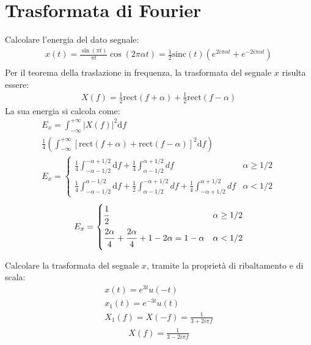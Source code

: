 \documentclass{article}
\newcommand{\rect}{\mbox{rect}}
\newcommand{\sinc}{\mbox{sinc}}
\newcommand{\df}{\mathrm{d}}
\begin{document}
\clearpage

\section{Trasformata di Fourier}
Calcolare l'energia del dato segnale:
\begin{gather*}
    x(t)=\displaystyle\frac{\sin(\pi t)}{\pi t}\cos(2\pi \alpha t)=\frac{1}{2}\sinc(t)(e^{2i\pi\alpha t}+e^{-2i\pi\alpha t})\\
\end{gather*}
Per il teorema della traslazione in frequenza, la trasformata del segnale $x$ risulta essere:
\begin{gather*}
    X(f)=\displaystyle\frac{1}{2}\rect(f+\alpha)+\frac{1}{2}\rect(f-\alpha)
\end{gather*}
La sua energia si calcola come:
\begin{gather*}
    E_x=\displaystyle\int_{-\infty}^{+\infty}|X(f)|^2\df f\\
    \displaystyle\frac{1}{4}\left(\int_{-\infty}^{+\infty}\left[\rect(f+\alpha)+\rect(f-\alpha)\right]^2\df f\right)\\
    E_x=\begin{cases}
        \displaystyle\frac{1}{4}\int_{-\alpha-1/2}^{-\alpha+1/2}\df f+\frac{1}{4}\int_{\alpha-1/2}^{\alpha+1/2}df& \alpha\geq1/2\\
        \displaystyle\frac{1}{4}\int_{-\alpha-1/2}^{\alpha-1/2}\df f+\frac{1}{2}\int_{\alpha-1/2}^{-\alpha+1/2}df+\frac{1}{4}\int_{-\alpha+1/2}^{\alpha+1/2}df&\alpha<1/2
    \end{cases}
\end{gather*}
\begin{gather}
    E_x=\begin{cases}
        \displaystyle\frac{\strut 1}{\strut 2}&\alpha\geq1/2\\
        \displaystyle\frac{\strut 2\alpha}{\strut 4}+\frac{\strut 2\alpha}{\strut 4}+1-2\alpha=1-\alpha&\alpha<1/2
    \end{cases}
\end{gather}


Calcolare la trasformata del segnale $x$, tramite la proprietà di ribaltamento e di scala: 
\begin{gather*}
    x(t)=e^{3t}u(-t)\\
    x_1(t)=e^{-3t}u(t)\\
    X_1(f)=X(-f)=\displaystyle\frac{1}{3+2i\pi f}
\end{gather*}
\begin{gather}
    X(f)=\displaystyle\frac{1}{3-2i\pi f}
\end{gather}
\end{document}

